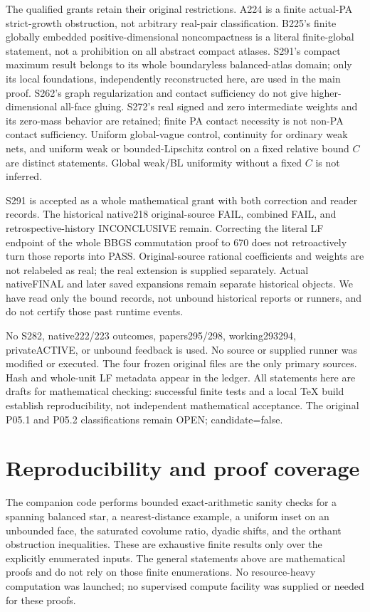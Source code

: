 \documentclass[
  11pt,
]{article}
\begin{document}
The qualified grants retain their original restrictions. A224 is a
finite actual-PA strict-growth obstruction, not arbitrary real-pair
classification. B225's finite globally embedded positive-dimensional
noncompactness is a literal finite-global statement, not a prohibition
on all abstract compact atlases. S291's compact maximum result belongs
to its whole boundaryless balanced-atlas domain; only its local
foundations, independently reconstructed here, are used in the main
proof. S262's graph regularization and contact sufficiency do not give
higher-dimensional all-face gluing. S272's real signed and zero
intermediate weights and its zero-mass behavior are retained; finite PA
contact necessity is not non-PA contact sufficiency. Uniform
global-vague control, continuity for ordinary weak nets, and uniform
weak or bounded-Lipschitz control on a fixed relative bound \(C\) are
distinct statements. Global weak/BL uniformity without a fixed \(C\) is
not inferred.

S291 is accepted as a whole mathematical grant with both correction and
reader records. The historical native218 original-source FAIL, combined
FAIL, and retrospective-history INCONCLUSIVE remain. Correcting the
literal LF endpoint of the whole BBGS commutation proof to 670 does not
retroactively turn those reports into PASS. Original-source rational
coefficients and weights are not relabeled as real; the real extension
is supplied separately. Actual nativeFINAL and later saved expansions
remain separate historical objects. We have read only the bound records,
not unbound historical reports or runners, and do not certify those past
runtime events.

No S282, native222/223 outcomes, papers295/298, working293294,
privateACTIVE, or unbound feedback is used. No source or supplied runner
was modified or executed. The four frozen original files are the only
primary sources. Hash and whole-unit LF metadata appear in the ledger.
All statements here are drafts for mathematical checking: successful
finite tests and a local TeX build establish reproducibility, not
independent mathematical acceptance. The original P05.1 and P05.2
classifications remain OPEN; candidate=false.

\section{Reproducibility and proof
coverage}\label{reproducibility-and-proof-coverage}

The companion code performs bounded exact-arithmetic sanity checks for a
spanning balanced star, a nearest-distance example, a uniform inset on
an unbounded face, the saturated covolume ratio, dyadic shifts, and the
orthant obstruction inequalities. These are exhaustive finite results
only over the explicitly enumerated inputs. The general statements above
are mathematical proofs and do not rely on those finite enumerations. No
resource-heavy computation was launched; no supervised compute facility
was supplied or needed for these proofs.
\end{document}
